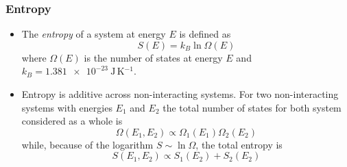 \documentclass[11pt, a4paper]{article}
\begin{document}
\subsubsection{Entropy}
\begin{itemize}
	\item The \textit{entropy} of a system at energy $ E $ is defined as
	\begin{equation*}
		S(E) = k_{B} \ln \Omega(E)
	\end{equation*}
	where $ \Omega(E) $ is the number of states at energy $ E $ and $ k_{B} = \SI{1.381e-23}{\joule \, \kelvin^{-1}} $.
	
	\item Entropy is additive across non-interacting systems. For two non-interacting systems with energies $ E_{1} $ and $ E_{2} $ the total number of states for both system considered as a whole is 
	\begin{equation*}
		\Omega(E_{1}, E_{2}) \propto \Omega_{1}(E_{1})\Omega_{2}(E_{2})
	\end{equation*}
	while, because of the logarithm $ S \sim \ln \Omega $, the total entropy is
	\begin{equation*}
		S(E_{1}, E_{2}) \propto S_{1}(E_{2}) + S_{2}(E_{2})
	\end{equation*}
\end{itemize}
\end{document}
